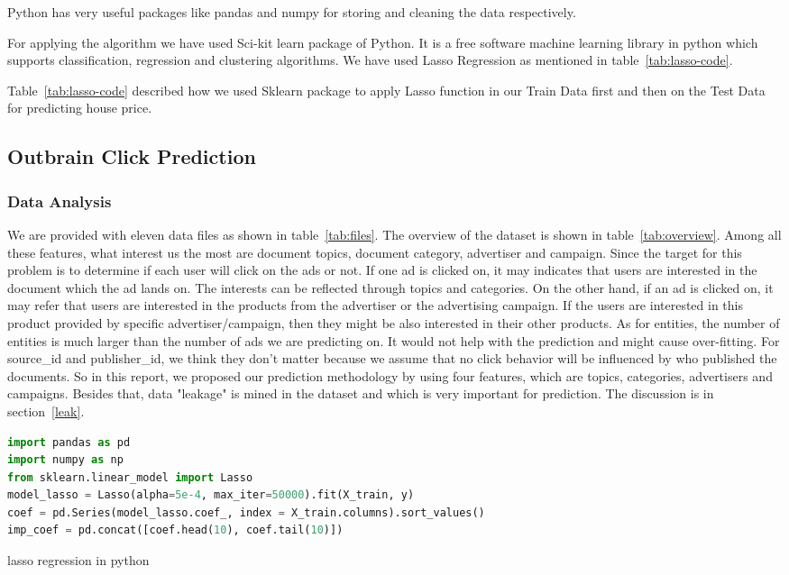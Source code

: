 \documentclass[fleqn,10pt]{SelfArx} %
\begin{document}
Python has very useful packages like pandas and numpy for storing and cleaning the data respectively.

For applying the algorithm we have used Sci-kit learn package of Python\cite{wiki:scikit}. It is a free software machine learning library in python which supports classification, regression and clustering algorithms. We have used Lasso Regression as mentioned in  table~\ref{tab:lasso-code}.

Table~\ref{tab:lasso-code} described how we used Sklearn package to apply Lasso function in our Train Data first and then on the Test Data for predicting house price.

\subsection{Outbrain Click Prediction} 

\subsubsection{Data Analysis}
We are provided with eleven data files as shown in table~\ref{tab:files}. The overview of the dataset is shown in table~\ref{tab:overview}. Among all these features, what interest us the most are document topics, document category, advertiser and campaign. Since the target for this problem is to determine if each user will click on the ads or not. If one ad is clicked on, it may indicates that users are interested in the document which the ad lands on. The interests can be reflected through topics and categories. On the other hand, if an ad is clicked on, it may refer that users are interested in the products from the advertiser or the advertising campaign. If the users are interested in this product provided by specific advertiser/campaign, then they might be also interested in their other products. As for entities, the number of entities is much larger than the number of ads we are predicting on. It would not help with the prediction and might cause over-fitting. For source\_id and publisher\_id, we think they don't matter because we assume that no click behavior will be influenced by who published the documents. So in this report, we proposed our prediction methodology by using four features, which are topics, categories, advertisers and campaigns. Besides that, data "leakage" is mined in the dataset and which is very important for prediction. The discussion is in section~\ref{leak}.

\begin{table}
\begin{framed}
\begin{lstlisting}[language=Python]
import pandas as pd
import numpy as np
from sklearn.linear_model import Lasso
model_lasso = Lasso(alpha=5e-4, max_iter=50000).fit(X_train, y)
coef = pd.Series(model_lasso.coef_, index = X_train.columns).sort_values()
imp_coef = pd.concat([coef.head(10), coef.tail(10)])
\end{lstlisting}
\end{framed}
\caption{lasso regression in python}\label{tab:lasso-code}
\end{table}
\end{document}
